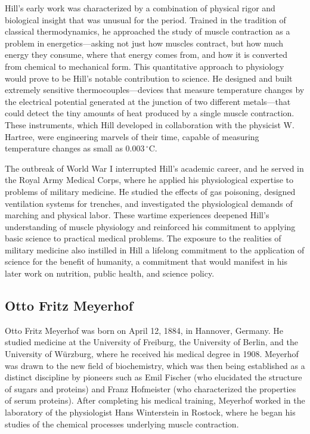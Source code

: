 Hill's early work was characterized by a combination of physical rigor and biological insight that was unusual for the period. Trained in the tradition of classical thermodynamics, he approached the study of muscle contraction as a problem in energetics---asking not just how muscles contract, but how much energy they consume, where that energy comes from, and how it is converted from chemical to mechanical form. This quantitative approach to physiology would prove to be Hill's notable contribution to science. He designed and built extremely sensitive thermocouples---devices that measure temperature changes by the electrical potential generated at the junction of two different metals---that could detect the tiny amounts of heat produced by a single muscle contraction. These instruments, which Hill developed in collaboration with the physicist W. Hartree, were engineering marvels of their time, capable of measuring temperature changes as small as 0.003\,$^{\circ}$C.

The outbreak of World War I interrupted Hill's academic career, and he served in the Royal Army Medical Corps, where he applied his physiological expertise to problems of military medicine. He studied the effects of gas poisoning, designed ventilation systems for trenches, and investigated the physiological demands of marching and physical labor. These wartime experiences deepened Hill's understanding of muscle physiology and reinforced his commitment to applying basic science to practical medical problems. The exposure to the realities of military medicine also instilled in Hill a lifelong commitment to the application of science for the benefit of humanity, a commitment that would manifest in his later work on nutrition, public health, and science policy.

\subsection{Otto Fritz Meyerhof}

Otto Fritz Meyerhof was born on April 12, 1884, in Hannover, Germany. He studied medicine at the University of Freiburg, the University of Berlin, and the University of W{\"u}rzburg, where he received his medical degree in 1908. Meyerhof was drawn to the new field of biochemistry, which was then being established as a distinct discipline by pioneers such as Emil Fischer (who elucidated the structure of sugars and proteins) and Franz Hofmeister (who characterized the properties of serum proteins). After completing his medical training, Meyerhof worked in the laboratory of the physiologist Hans Winterstein in Rostock, where he began his studies of the chemical processes underlying muscle contraction.

